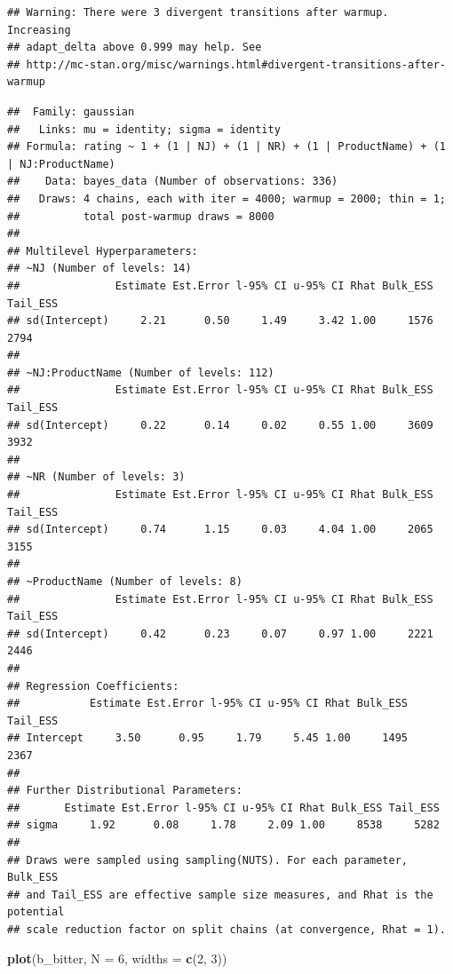 \documentclass[
]{book}
\newenvironment{Shaded}{\begin{snugshade}}{\end{snugshade}}
\newcommand{\AttributeTok}[1]{\textcolor[rgb]{0.13,0.29,0.53}{#1}}
\newcommand{\DecValTok}[1]{\textcolor[rgb]{0.00,0.00,0.81}{#1}}
\newcommand{\FunctionTok}[1]{\textcolor[rgb]{0.13,0.29,0.53}{\textbf{#1}}}
\newcommand{\NormalTok}[1]{#1}
\begin{document}
\begin{verbatim}
## Warning: There were 3 divergent transitions after warmup. Increasing
## adapt_delta above 0.999 may help. See
## http://mc-stan.org/misc/warnings.html#divergent-transitions-after-warmup
\end{verbatim}

\begin{verbatim}
##  Family: gaussian 
##   Links: mu = identity; sigma = identity 
## Formula: rating ~ 1 + (1 | NJ) + (1 | NR) + (1 | ProductName) + (1 | NJ:ProductName) 
##    Data: bayes_data (Number of observations: 336) 
##   Draws: 4 chains, each with iter = 4000; warmup = 2000; thin = 1;
##          total post-warmup draws = 8000
## 
## Multilevel Hyperparameters:
## ~NJ (Number of levels: 14) 
##               Estimate Est.Error l-95% CI u-95% CI Rhat Bulk_ESS Tail_ESS
## sd(Intercept)     2.21      0.50     1.49     3.42 1.00     1576     2794
## 
## ~NJ:ProductName (Number of levels: 112) 
##               Estimate Est.Error l-95% CI u-95% CI Rhat Bulk_ESS Tail_ESS
## sd(Intercept)     0.22      0.14     0.02     0.55 1.00     3609     3932
## 
## ~NR (Number of levels: 3) 
##               Estimate Est.Error l-95% CI u-95% CI Rhat Bulk_ESS Tail_ESS
## sd(Intercept)     0.74      1.15     0.03     4.04 1.00     2065     3155
## 
## ~ProductName (Number of levels: 8) 
##               Estimate Est.Error l-95% CI u-95% CI Rhat Bulk_ESS Tail_ESS
## sd(Intercept)     0.42      0.23     0.07     0.97 1.00     2221     2446
## 
## Regression Coefficients:
##           Estimate Est.Error l-95% CI u-95% CI Rhat Bulk_ESS Tail_ESS
## Intercept     3.50      0.95     1.79     5.45 1.00     1495     2367
## 
## Further Distributional Parameters:
##       Estimate Est.Error l-95% CI u-95% CI Rhat Bulk_ESS Tail_ESS
## sigma     1.92      0.08     1.78     2.09 1.00     8538     5282
## 
## Draws were sampled using sampling(NUTS). For each parameter, Bulk_ESS
## and Tail_ESS are effective sample size measures, and Rhat is the potential
## scale reduction factor on split chains (at convergence, Rhat = 1).
\end{verbatim}

\begin{Shaded}
\begin{Highlighting}[]
\FunctionTok{plot}\NormalTok{(b\_bitter, }\AttributeTok{N =} \DecValTok{6}\NormalTok{, }\AttributeTok{widths =} \FunctionTok{c}\NormalTok{(}\DecValTok{2}\NormalTok{, }\DecValTok{3}\NormalTok{))}
\end{Highlighting}
\end{Shaded}
\end{document}
